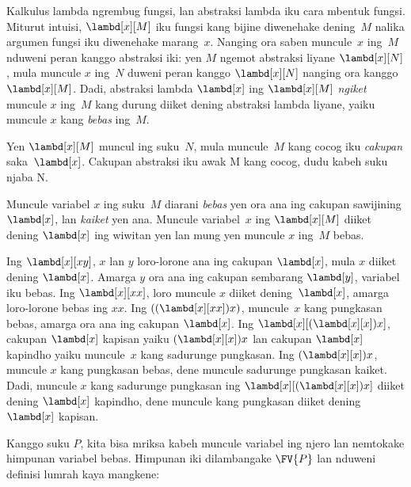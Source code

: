 \documentclass[../../../include/open-logic-section]{subfiles}
\begin{document}

Kalkulus lambda ngrembug fungsi, lan
abstraksi lambda iku cara mbentuk fungsi.
Miturut intuisi, $\lambd[x][M]$ iku
fungsi kang bijine diwenehake dening~$M$
nalika argumen fungsi iku diwenehake
marang~$x$. Nanging ora saben muncule~$x$
ing~$M$ nduweni peran kanggo abstraksi iki:
yen $M$ ngemot abstraksi liyane
$\lambd[x][N]$, mula muncule $x$ ing~$N$
duweni peran kanggo $\lambd[x][N]$
nanging ora kanggo $\lambd[x][M]$.
Dadi, abstraksi lambda $\lambd[x]$ ing
$\lambd[x][M]$ \emph{ngiket} muncule
$x$ ing~$M$ kang durung diiket dening
abstraksi lambda liyane, yaiku muncule
$x$ kang \emph{bebas} ing~$M$.

\begin{defn}[Cakupan]
Yen $\lambd[x][M]$ muncul ing suku~$N$,
mula muncule~$M$ kang cocog iku
\emph{cakupan} saka~$\lambd[x]$. Cakupan abstraksi iku awak M kang cocog, dudu kabeh suku njaba N.
\end{defn}


\begin{defn}
  Muncule variabel $x$ ing suku~$M$
  diarani \emph{bebas} yen ora ana
  ing cakupan sawijining $\lambd[x]$,
  lan \emph{kaiket} yen ana.
  Muncule variabel~$x$ ing
  $\lambd[x][M]$ diiket dening
  $\lambd[x]$ ing wiwitan yen lan
  mung yen muncule $x$ ing~$M$
  bebas.
\end{defn}

\begin{ex}
  Ing $\lambd[x][x y]$, $x$ lan $y$
  loro-lorone ana ing cakupan
  $\lambd[x]$, mula $x$ diiket
  dening $\lambd[x]$. Amarga $y$
  ora ana ing cakupan sembarang
  $\lambd[y]$, variabel iku bebas.
  Ing $\lambd[x][x x]$, loro
  muncule $x$ diiket dening~$\lambd[x]$,
  amarga loro-lorone bebas ing $xx$.
  Ing $((\lambd[x][xx])x)$,
  muncule~$x$ kang pungkasan bebas,
  amarga ora ana ing cakupan
  $\lambd[x]$. Ing
  $\lambd[x][(\lambd[x][x])x]$,
  cakupan $\lambd[x]$ kapisan yaiku
  $(\lambd[x][x])x$ lan cakupan
  $\lambd[x]$ kapindho yaiku muncule~$x$
  kang sadurunge pungkasan.
  Ing $(\lambd[x][x])x$, muncule
  $x$ kang pungkasan bebas, dene
  muncule sadurunge pungkasan kaiket.
  Dadi, muncule $x$ kang sadurunge
  pungkasan ing
  $\lambd[x][(\lambd[x][x])x]$
  diiket dening $\lambd[x]$ kapindho,
  dene muncule kang pungkasan
  diiket dening $\lambd[x]$ kapisan.
\end{ex}

Kanggo suku $P$, kita bisa mriksa
kabeh muncule variabel ing njero
lan nemtokake himpunan variabel
bebas. Himpunan iki dilambangake
$\FV{P}$ lan nduweni definisi
lumrah kaya mangkene:
\end{document}
